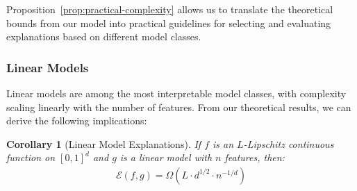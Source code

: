 \documentclass[11pt,letter,leqno]{article}
\newtheorem{corollary}[theorem]{Corollary}
\begin{document}
Proposition~\ref{prop:practical-complexity} allows us to translate the theoretical bounds from our model into practical guidelines for selecting and evaluating explanations based on different model classes.

\subsubsection{Linear Models}
\label{subsubsec:linear-models}

Linear models are among the most interpretable model classes, with complexity scaling linearly with the number of features.  From our theoretical results, we can derive the following implications:

\begin{corollary}[Linear Model Explanations]
\label{cor:linear-model}
If $f$ is an $L$-Lipschitz continuous function on $[0, 1]^d$ and $g$ is a linear model with $n$ features, then:
\begin{align}
\mathcal{E}(f, g) = \Omega\left(L \cdot d^{1/2} \cdot n^{-1/d}\right)
\end{align}
\end{corollary}
\end{document}
